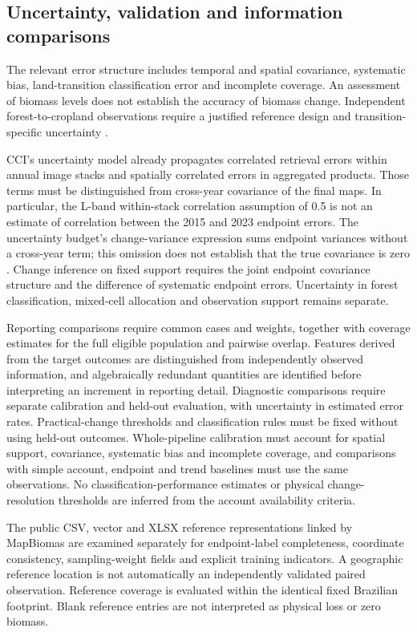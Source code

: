 \documentclass[11pt,a4paper]{article}
\begin{document}


\subsection{Uncertainty, validation and information comparisons}
The relevant error structure includes temporal and spatial covariance, systematic bias, land-transition classification error and incomplete coverage. An assessment of biomass levels does not establish the accuracy of biomass change. Independent forest-to-cropland observations require a justified reference design and transition-specific uncertainty \citep{Olofsson2014}.

CCI's uncertainty model already propagates correlated retrieval errors within annual image stacks and spatially correlated errors in aggregated products. Those terms must be distinguished from cross-year covariance of the final maps. In particular, the L-band within-stack correlation assumption of 0.5 is not an estimate of correlation between the 2015 and 2023 endpoint errors. The uncertainty budget's change-variance expression sums endpoint variances without a cross-year term; this omission does not establish that the true covariance is zero \citep[pp.~14--22, 23--28]{E3UB2025}. Change inference on fixed support requires the joint endpoint covariance structure and the difference of systematic endpoint errors. Uncertainty in forest classification, mixed-cell allocation and observation support remains separate.

Reporting comparisons require common cases and weights, together with coverage estimates for the full eligible population and pairwise overlap. Features derived from the target outcomes are distinguished from independently observed information, and algebraically redundant quantities are identified before interpreting an increment in reporting detail. Diagnostic comparisons require separate calibration and held-out evaluation, with uncertainty in estimated error rates. Practical-change thresholds and classification rules must be fixed without using held-out outcomes. Whole-pipeline calibration must account for spatial support, covariance, systematic bias and incomplete coverage, and comparisons with simple account, endpoint and trend baselines must use the same observations. No classification-performance estimates or physical change-resolution thresholds are inferred from the account availability criteria.

The public CSV, vector and XLSX reference representations linked by MapBiomas are examined separately for endpoint-label completeness, coordinate consistency, sampling-weight fields and explicit training indicators. A geographic reference location is not automatically an independently validated paired observation. Reference coverage is evaluated within the identical fixed Brazilian footprint. Blank reference entries are not interpreted as physical loss or zero biomass.
\end{document}
